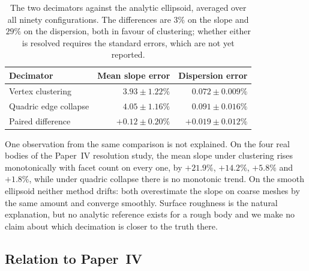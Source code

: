 \begin{table}[htbp]
\centering
\small
\caption{The two decimators against the analytic ellipsoid, averaged over
all ninety configurations. The differences are $3\%$ on the slope and $29\%$
on the dispersion, both in favour of clustering; whether either is
resolved requires the standard errors, which are not yet reported.}
\label{tab:decimator}
\setlength{\tabcolsep}{12pt}
\begin{tabular}{lrr}
\toprule
Decimator & Mean slope error & Dispersion error \\
\midrule
Vertex clustering     & $3.93 \pm 1.22\%$ & $0.072 \pm 0.009\%$ \\
Quadric edge collapse & $4.05 \pm 1.16\%$ & $0.091 \pm 0.016\%$ \\
\midrule
Paired difference     & $+0.12 \pm 0.20\%$ & $+0.019 \pm 0.012\%$ \\
\bottomrule
\end{tabular}
\end{table}

One observation from the same comparison is not explained. On the four real
bodies of the Paper~IV resolution study, the mean slope under clustering
rises monotonically with facet count on every one, by $+21.9\%$, $+14.2\%$,
$+5.8\%$ and $+1.8\%$, while under quadric collapse there is no monotonic
trend. On the smooth ellipsoid neither method drifts: both overestimate the
slope on coarse meshes by the same amount and converge smoothly. Surface
roughness is the natural explanation, but no analytic reference exists for a
rough body and we make no claim about which decimation is closer to the
truth there.

\subsection{Relation to Paper~IV}
\label{sec:discussion:paper4}

